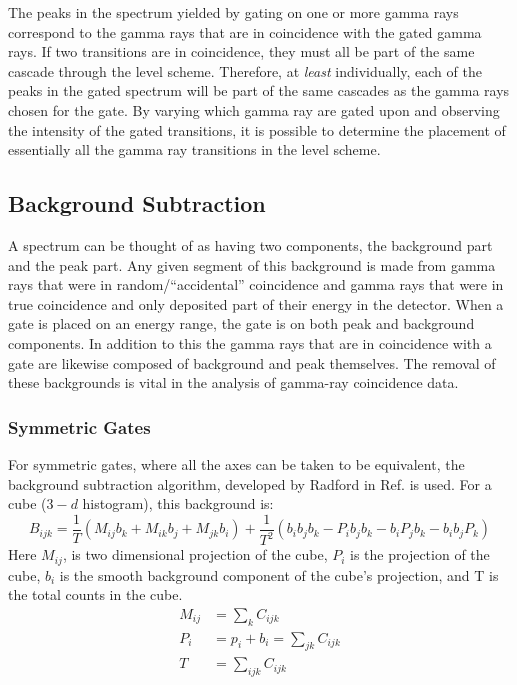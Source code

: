 The peaks in the spectrum yielded by gating on one or more gamma rays correspond to the gamma rays that are in coincidence with the gated gamma rays. If two transitions are in coincidence, they must all be part of the same cascade through the level scheme. Therefore, at \emph{least} individually, each of the peaks in the gated spectrum will be part of the same cascades as the gamma rays chosen for the gate. By varying which gamma ray are gated upon and observing the intensity of the gated transitions, it is possible to determine the placement of essentially all the gamma ray transitions in the level scheme.

\subsection{Background Subtraction}
\label{ssec:exp-pr-data-proc-bg-sub}
A spectrum can be thought of as having two components, the background part and the peak part. Any given segment of this background is made from gamma rays that were in random/``accidental'' coincidence and gamma rays that were in true coincidence and only deposited part of their energy in the detector. When a gate is placed on an energy range, the gate is on both peak and background components. In addition to this the gamma rays that are in coincidence with a gate are likewise composed of background and peak themselves. The removal of these backgrounds is vital in the analysis of gamma-ray coincidence data.

\subsubsection{Symmetric Gates}
\label{sssec:exp-pr-data-proc-bg-sub-sym}
For symmetric gates, where all the axes can be taken to be equivalent, the background subtraction algorithm, developed by Radford in Ref. \cite{symBGSub} is used. For a cube ($3-d$ histogram), this background is:
\begin{equation}
\label{eqn:chp3-cube-bg}
B_{ijk}=\frac{1}{T}\left(M_{ij}b_{k} + M_{ik}b_{j} + M_{jk}b_{i}\right) + \frac{1}{T^{2}}\left(b_{i}b_{j}b_{k} - P_{i}b_{j}b_{k} - b_{i}P_{j}b_{k} - b_{i}b_{j}P_{k}\right)
\end{equation} 
Here $M_{ij}$, is two dimensional projection of the cube, $P_{i}$ is the projection of the cube, $b_{i}$ is the smooth background component of the cube's projection, and T is the total counts in the cube.
\begin{align}
\label{eqn:chp3-cube-bg-defs}
M_{ij} &= \sum\limits_{k}^{}C_{ijk} \\
P_i &= p_i + b_i = \sum\limits_{jk}^{}C_{ijk}\\
T &= \sum\limits_{ijk}^{}C_{ijk}
\end{align}

